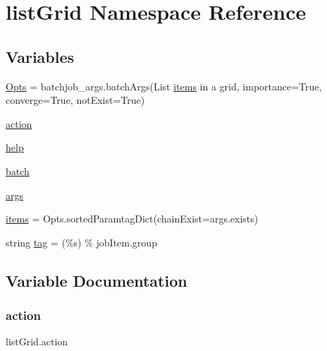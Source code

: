 \hypertarget{namespacelistGrid}{}\section{list\+Grid Namespace Reference}
\label{namespacelistGrid}
\subsection*{Variables}
\begin{DoxyCompactItemize}
\item 
\mbox{\hyperlink{namespacelistGrid_a2f4dfd6918f45257401e3b5d4dbb557e}{Opts}} = batchjob\+\_\+args.\+batch\+Args(\textquotesingle{}List \mbox{\hyperlink{namespacelistGrid_a26521e1c761d77bbc23ee4ecc98b92ff}{items}} in a grid\textquotesingle{}, importance=True, converge=True, not\+Exist=True)
\item 
\mbox{\hyperlink{namespacelistGrid_af564d02a35f723ef607a840be88de663}{action}}
\item 
\mbox{\hyperlink{namespacelistGrid_ad219e78d46c196476b5a977aed4bd0a6}{help}}
\item 
\mbox{\hyperlink{namespacelistGrid_a1a97033b20d3a555487a2db14d9c3d2b}{batch}}
\item 
\mbox{\hyperlink{namespacelistGrid_a46b13701cc1fa316be1811c183312770}{args}}
\item 
\mbox{\hyperlink{namespacelistGrid_a26521e1c761d77bbc23ee4ecc98b92ff}{items}} = Opts.\+sorted\+Paramtag\+Dict(chain\+Exist=args.\+exists)
\item 
string \mbox{\hyperlink{namespacelistGrid_a93127bd8469d19ea1502dcfdf9597eef}{tag}} = \textquotesingle{}(\%s)\textquotesingle{} \% job\+Item.\+group
\end{DoxyCompactItemize}


\subsection{Variable Documentation}
\mbox{\label{namespacelistGrid_af564d02a35f723ef607a840be88de663}} 
\subsubsection{\texorpdfstring{action}{action}}
{\footnotesize\ttfamily list\+Grid.\+action}

\mbox{\label{namespacelistGrid_a46b13701cc1fa316be1811c183312770}} 
